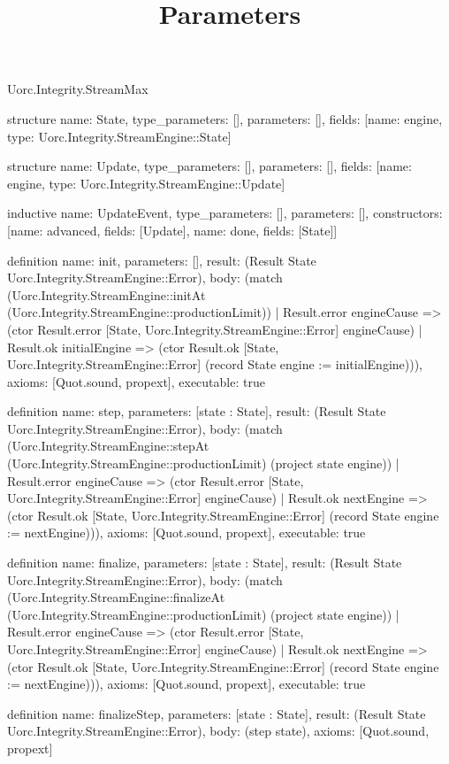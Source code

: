 \begin{lexlean}{Uorc.Integrity.StreamMax}
\title{Parameters}
\begin{semanticmodule}
structure{
  name: State,
  type_parameters: [],
  parameters: [],
  fields: [{name: engine, type: Uorc.Integrity.StreamEngine::State}]
}

structure{
  name: Update,
  type_parameters: [],
  parameters: [],
  fields: [{name: engine, type: Uorc.Integrity.StreamEngine::Update}]
}

inductive{
  name: UpdateEvent,
  type_parameters: [],
  parameters: [],
  constructors: [{name: advanced, fields: [Update]}, {name: done, fields: [State]}]
}

definition{
  name: init,
  parameters: [],
  result: (Result State Uorc.Integrity.StreamEngine::Error),
  body: (match (Uorc.Integrity.StreamEngine::initAt (Uorc.Integrity.StreamEngine::productionLimit))
    | Result.error engineCause => (ctor Result.error [State, Uorc.Integrity.StreamEngine::Error] engineCause)
    | Result.ok initialEngine => (ctor Result.ok [State, Uorc.Integrity.StreamEngine::Error] (record State {engine := initialEngine}))),
  axioms: [Quot.sound, propext],
  executable: true
}

definition{
  name: step,
  parameters: [state : State],
  result: (Result State Uorc.Integrity.StreamEngine::Error),
  body: (match (Uorc.Integrity.StreamEngine::stepAt (Uorc.Integrity.StreamEngine::productionLimit) (project state engine))
    | Result.error engineCause => (ctor Result.error [State, Uorc.Integrity.StreamEngine::Error] engineCause)
    | Result.ok nextEngine => (ctor Result.ok [State, Uorc.Integrity.StreamEngine::Error] (record State {engine := nextEngine}))),
  axioms: [Quot.sound, propext],
  executable: true
}

definition{
  name: finalize,
  parameters: [state : State],
  result: (Result State Uorc.Integrity.StreamEngine::Error),
  body: (match (Uorc.Integrity.StreamEngine::finalizeAt (Uorc.Integrity.StreamEngine::productionLimit) (project state engine))
    | Result.error engineCause => (ctor Result.error [State, Uorc.Integrity.StreamEngine::Error] engineCause)
    | Result.ok nextEngine => (ctor Result.ok [State, Uorc.Integrity.StreamEngine::Error] (record State {engine := nextEngine}))),
  axioms: [Quot.sound, propext],
  executable: true
}

definition{
  name: finalizeStep,
  parameters: [state : State],
  result: (Result State Uorc.Integrity.StreamEngine::Error),
  body: (step state),
  axioms: [Quot.sound, propext]
}


\end{semanticmodule}
\end{lexlean}
